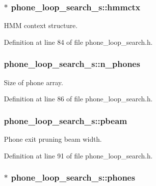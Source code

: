 \subsubsection[{hmmctx}]{$\ast$ {\bf phone\-\_\-loop\-\_\-search\-\_\-s\-::hmmctx}}\label{structphone__loop__search__s_a67c44a95de79cb421fbeed4432686f48}


\-H\-M\-M context structure. 



\-Definition at line 84 of file phone\-\_\-loop\-\_\-search.\-h.

\subsubsection[{n\-\_\-phones}]{ {\bf phone\-\_\-loop\-\_\-search\-\_\-s\-::n\-\_\-phones}}\label{structphone__loop__search__s_a7844f45806d19d229504378da16bdc4c}


\-Size of phone array. 



\-Definition at line 86 of file phone\-\_\-loop\-\_\-search.\-h.

\subsubsection[{pbeam}]{ {\bf phone\-\_\-loop\-\_\-search\-\_\-s\-::pbeam}}\label{structphone__loop__search__s_aaace8b677a536e41bb4616e6695b11d3}


\-Phone exit pruning beam width. 



\-Definition at line 91 of file phone\-\_\-loop\-\_\-search.\-h.

\subsubsection[{phones}]{$\ast$ {\bf phone\-\_\-loop\-\_\-search\-\_\-s\-::phones}}\label{structphone__loop__search__s_af543cdcfbfd8d43e5beba4bd6c47fd80}


